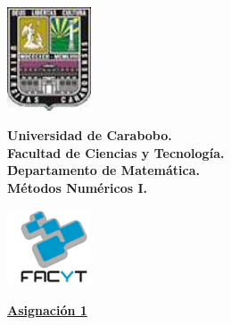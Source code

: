 \documentclass[12pt,letterpaper]{article}
\begin{document}
\begin{minipage}[ht]{3cm}
\includegraphics[width=2.5cm]{Logouc.jpg}
\end{minipage}
\begin{minipage}{10cm}
\centering\textbf{Universidad de Carabobo.\\
 Facultad de Ciencias y Tecnolog\'ia.\\
\'Departamento de Matem\'atica.\\
 M\'etodos Num\'ericos I.\\
}
\end{minipage}
\begin{minipage}[ht]{4cm}
\includegraphics[width=2.5cm]{facyt.jpg}
\end{minipage}

\begin{center}
\underline{\textbf{Asignaci\'on 1}}\\[7pt]
\end{center}

\vspace{0.5cm}
\end{document}

